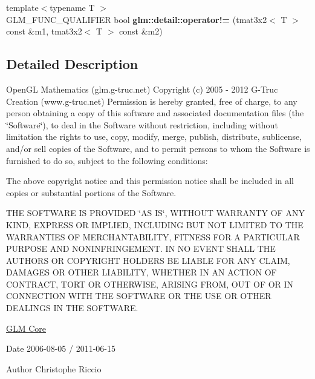 \begin{DoxyCompactItemize}
\item 
\hypertarget{namespaceglm_1_1detail_a186f05d94039d3ce63c15a4426294ea2}{{\footnotesize template$<$typename T $>$ }\\G\-L\-M\-\_\-\-F\-U\-N\-C\-\_\-\-Q\-U\-A\-L\-I\-F\-I\-E\-R bool {\bfseries glm\-::detail\-::operator!=} (tmat3x2$<$ T $>$ const \&m1, tmat3x2$<$ T $>$ const \&m2)}\label{namespaceglm_1_1detail_a186f05d94039d3ce63c15a4426294ea2}

\end{DoxyCompactItemize}


\subsection{Detailed Description}
Open\-G\-L Mathematics (glm.\-g-\/truc.\-net) Copyright (c) 2005 -\/ 2012 G-\/\-Truc Creation (www.\-g-\/truc.\-net) Permission is hereby granted, free of charge, to any person obtaining a copy of this software and associated documentation files (the \char`\"{}\-Software\char`\"{}), to deal in the Software without restriction, including without limitation the rights to use, copy, modify, merge, publish, distribute, sublicense, and/or sell copies of the Software, and to permit persons to whom the Software is furnished to do so, subject to the following conditions\-:

The above copyright notice and this permission notice shall be included in all copies or substantial portions of the Software.

T\-H\-E S\-O\-F\-T\-W\-A\-R\-E I\-S P\-R\-O\-V\-I\-D\-E\-D \char`\"{}\-A\-S I\-S\char`\"{}, W\-I\-T\-H\-O\-U\-T W\-A\-R\-R\-A\-N\-T\-Y O\-F A\-N\-Y K\-I\-N\-D, E\-X\-P\-R\-E\-S\-S O\-R I\-M\-P\-L\-I\-E\-D, I\-N\-C\-L\-U\-D\-I\-N\-G B\-U\-T N\-O\-T L\-I\-M\-I\-T\-E\-D T\-O T\-H\-E W\-A\-R\-R\-A\-N\-T\-I\-E\-S O\-F M\-E\-R\-C\-H\-A\-N\-T\-A\-B\-I\-L\-I\-T\-Y, F\-I\-T\-N\-E\-S\-S F\-O\-R A P\-A\-R\-T\-I\-C\-U\-L\-A\-R P\-U\-R\-P\-O\-S\-E A\-N\-D N\-O\-N\-I\-N\-F\-R\-I\-N\-G\-E\-M\-E\-N\-T. I\-N N\-O E\-V\-E\-N\-T S\-H\-A\-L\-L T\-H\-E A\-U\-T\-H\-O\-R\-S O\-R C\-O\-P\-Y\-R\-I\-G\-H\-T H\-O\-L\-D\-E\-R\-S B\-E L\-I\-A\-B\-L\-E F\-O\-R A\-N\-Y C\-L\-A\-I\-M, D\-A\-M\-A\-G\-E\-S O\-R O\-T\-H\-E\-R L\-I\-A\-B\-I\-L\-I\-T\-Y, W\-H\-E\-T\-H\-E\-R I\-N A\-N A\-C\-T\-I\-O\-N O\-F C\-O\-N\-T\-R\-A\-C\-T, T\-O\-R\-T O\-R O\-T\-H\-E\-R\-W\-I\-S\-E, A\-R\-I\-S\-I\-N\-G F\-R\-O\-M, O\-U\-T O\-F O\-R I\-N C\-O\-N\-N\-E\-C\-T\-I\-O\-N W\-I\-T\-H T\-H\-E S\-O\-F\-T\-W\-A\-R\-E O\-R T\-H\-E U\-S\-E O\-R O\-T\-H\-E\-R D\-E\-A\-L\-I\-N\-G\-S I\-N T\-H\-E S\-O\-F\-T\-W\-A\-R\-E.

\hyperlink{group__core}{G\-L\-M Core}

\begin{DoxyDate}{Date}
2006-\/08-\/05 / 2011-\/06-\/15 
\end{DoxyDate}
\begin{DoxyAuthor}{Author}
Christophe Riccio 
\end{DoxyAuthor}
